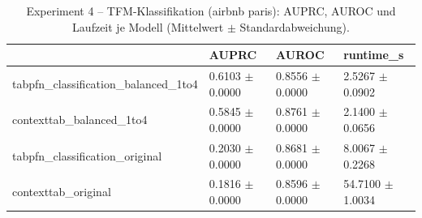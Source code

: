 \begin{table}
\centering
\caption{Experiment 4 -- TFM-Klassifikation (airbnb paris): AUPRC, AUROC und Laufzeit je Modell (Mittelwert $\pm$ Standardabweichung).}
\label{tab:exp4_airbnb_paris}
\begin{tabular}{llll}
\toprule
 & \bfseries AUPRC & \bfseries AUROC & \bfseries runtime\_s \\
\midrule
tabpfn\_classification\_balanced\_1to4 & 0.6103 $\pm$ 0.0000 & 0.8556 $\pm$ 0.0000 & 2.5267 $\pm$ 0.0902 \\
contexttab\_balanced\_1to4 & 0.5845 $\pm$ 0.0000 & 0.8761 $\pm$ 0.0000 & 2.1400 $\pm$ 0.0656 \\
tabpfn\_classification\_original & 0.2030 $\pm$ 0.0000 & 0.8681 $\pm$ 0.0000 & 8.0067 $\pm$ 0.2268 \\
contexttab\_original & 0.1816 $\pm$ 0.0000 & 0.8596 $\pm$ 0.0000 & 54.7100 $\pm$ 1.0034 \\
\bottomrule
\end{tabular}
\end{table}
